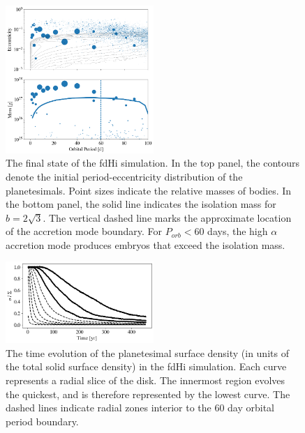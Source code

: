 \documentclass[twocolumn]{aastex63}
\begin{document}
\begin{figure}
\begin{center}
    \includegraphics[width=0.5\textwidth]{figures/fulldisk_e_m.png}
    \caption{The final state of the fdHi simulation. In the top panel, the contours denote the initial period-eccentricity distribution of the planetesimals. Point sizes indicate the relative masses of bodies. In the bottom panel, the solid line indicates the isolation mass for $b = 2 \sqrt{3}$. The vertical dashed line marks the approximate location of the accretion mode boundary. For $P_{orb} < 60$ days, the high $\alpha$ accretion mode produces embryos that exceed the isolation mass.\label{fig:fulldisk_e_m}}
\end{center}
\end{figure}

\begin{figure}
\begin{center}
    \includegraphics[width=0.5\textwidth]{figures/pl_frac_time.png}
    \caption{The time evolution of the planetesimal surface density (in units of the total solid surface density) in the fdHi simulation. Each curve represents a radial slice of the disk. The innermost region evolves the quickest, and is therefore represented by the lowest curve. The dashed lines indicate radial zones interior to the 60 day orbital period boundary.\label{fig:pl_frac_time}}
\end{center}
\end{figure}
\end{document}
